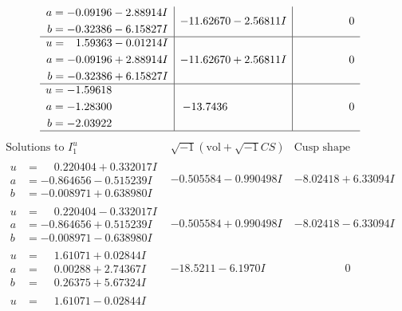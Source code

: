 \documentclass[1p]{elsarticle_modified}
\theoremstyle{definition}
\newcommand{\I}{\sqrt{-1}}
\begin{document}
$$\begin{array}{c|c|c}
\begin{aligned}
a &= -0.09196 - 2.88914 I \\
b &= -0.32386 - 6.15827 I\end{aligned}
 & -11.62670 - 2.56811 I & \phantom{-0.000000 } 0 \\ \hline\begin{aligned}
u &= \phantom{-}1.59363 - 0.01214 I \\
a &= -0.09196 + 2.88914 I \\
b &= -0.32386 + 6.15827 I\end{aligned}
 & -11.62670 + 2.56811 I & \phantom{-0.000000 } 0 \\ \hline\begin{aligned}
u &= -1.59618\phantom{ +0.000000I} \\
a &= -1.28300\phantom{ +0.000000I} \\
b &= -2.03922\phantom{ +0.000000I}\end{aligned}
 & -13.7436\phantom{ +0.000000I} & \phantom{-0.000000 } 0\\
 \hline 
 \end{array}$$\newpage$$\begin{array}{c|c|c}  
\text{Solutions to }I^u_{1}& \I (\text{vol} + \sqrt{-1}CS) & \text{Cusp shape}\\
 \hline 
\begin{aligned}
u &= \phantom{-}0.220404 + 0.332017 I \\
a &= -0.864656 - 0.515239 I \\
b &= -0.008971 + 0.638980 I\end{aligned}
 & -0.505584 - 0.990498 I & -8.02418 + 6.33094 I \\ \hline\begin{aligned}
u &= \phantom{-}0.220404 - 0.332017 I \\
a &= -0.864656 + 0.515239 I \\
b &= -0.008971 - 0.638980 I\end{aligned}
 & -0.505584 + 0.990498 I & -8.02418 - 6.33094 I \\ \hline\begin{aligned}
u &= \phantom{-}1.61071 + 0.02844 I \\
a &= \phantom{-}0.00288 + 2.74367 I \\
b &= \phantom{-}0.26375 + 5.67324 I\end{aligned}
 & -18.5211 - 6.1970 I & \phantom{-0.000000 } 0 \\ \hline\begin{aligned}
u &= \phantom{-}1.61071 - 0.02844 I \\

\end{aligned}
\end{array}$$
\end{document}

